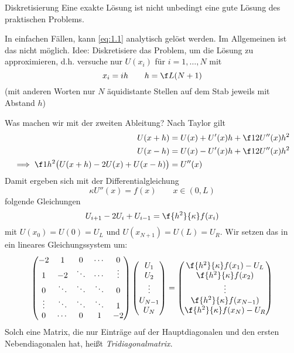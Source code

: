 \documentclass{mycourse}
\begin{document}
\begin{seg}{Diskretisierung}
Eine exakte Lösung ist nicht unbedingt eine gute Lösung des praktischen Problems.

In einfachen Fällen, kann \ref{eq:1.1} analytisch gelöst werden. Im Allgemeinen ist das nicht möglich.
Idee: Diskretisiere das Problem, um die Lösung zu approximieren, d.h. versuche nur $U(x_i)$ für $i=1,\ldots,N$ mit
\[
	x_i = ih \qquad h=\f L {(N+1)}
\]
(mit anderen Worten nur $N$ äquidistante Stellen auf dem Stab jeweils mit Abstand $h$)

Was machen wir mit der zweiten Ableitung?
Nach Taylor gilt
\begin{align*}
U(x+h) &= U(x) +U'(x)h + \f 1 2 U''(x)h^2\\
U(x-h) &= U(x) - U'(x)h + \f 1 2 U''(x)h^2\\
\implies \f 1 {h^2} \big(U(x+h) - 2U(x) + U(x-h)\big) &= U''(x)
\end{align*}
Damit ergeben sich mit der Differentialgleichung
\[
	\kappa U''(x) = f(x) \qquad	x \in (0,L)
\]
folgende Gleichungen
\[
	U_{i+1} - 2U_i + U_{i-1} = \f {h^2}{\kappa}f(x_i)
\]
mit $U(x_0) = U(0) = U_L$ und $U(x_{N+1}) = U(L) = U_R$.
Wir setzen das in ein lineares Gleichungssystem um:
\[
	\begin{pmatrix}
 -2      & 1       & 0       & \cdots   & 0   \\
 1       & -2      & \ddots      & \cdots   & \vdots   \\
 0       & \ddots  & \ddots  & \ddots   & 0 \\
\vdots   & \ddots  & \ddots  & \ddots   & 1       \\
0        & \cdots  & 0       &  1      & -2 \\
\end{pmatrix}
\begin{pmatrix}
 U_1  \\ U_2 \\  \vdots \\ U_{N-1} \\ U_N \\
\end{pmatrix}
=
\begin{pmatrix}
	\f {h^2}{\kappa} f(x_1)-U_L \\ \f {h^2}{\kappa}f(x_2) \\ \vdots \\ \f {h^2}{\kappa} f(x_{N-1}) \\ \f {h^2}{\kappa} f(x_N)-U_R \\
\end{pmatrix}
\]
Solch eine Matrix, die nur Einträge auf der Hauptdiagonalen und
den ersten Nebendiagonalen hat, heißt \emph{Tridiagonalmatrix}.
\end{seg}
\end{document}
